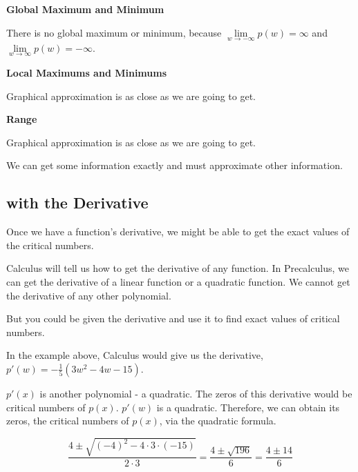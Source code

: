 \documentclass{ximera}
\begin{document}
\begin{example}
\textbf{Global Maximum and Minimum}

There is no global maximum or minimum, because  $\lim\limits_{w \to -\infty}p(w) = \infty$ and $\lim\limits_{w \to \infty}p(w) = -\infty$. 







\textbf{Local Maximums and Minimums}

Graphical approximation is as close as we are going to get. 






\textbf{Range}

Graphical approximation is as close as we are going to get. 

\end{example}

We can get some information exactly and must approximate other information.















\subsection*{with the Derivative}


Once we have a function's derivative, we might be able to get the exact values of the critical numbers. 


Calculus will tell us how to get the derivative of any function.  In Precalculus, we can get the derivative of a linear function or a quadratic function.  We cannot get the derivative of any other polynomial.

But you could be given the derivative and use it to find exact values of critical numbers. 




In the example above, Calculus would give us the derivative, $p'(w) = -\frac{1}{5}(3w^2 - 4w - 15)$. 

$p'(x)$ is another polynomial - a quadratic. The zeros of this derivative would be critical numbers of $p(x)$.  $p'(w)$ is a quadratic.  Therefore, we can obtain its zeros, the critical numbers of $p(x)$, via the quadratic formula.


\[  \frac{4 \pm \sqrt{(-4)^2 - 4 \cdot 3 \cdot (-15)}}{2 \cdot 3} =    \frac{4 \pm \sqrt{196}}{6}  = \frac{4 \pm 14}{6}       \]
\end{document}
